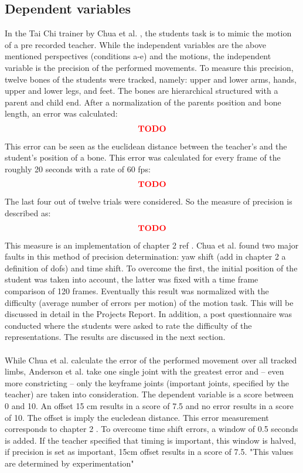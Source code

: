 \subsection{Dependent variables}
In the Tai Chi trainer by Chua et al. \cite{Chua}, the students task is to mimic the motion of a pre recorded teacher. While the independent variables are the above mentioned perspectives (conditions a-e) and the motions, the independent variable is the precision of the performed movements. To measure this precision, twelve bones of the students were tracked, namely: upper and lower arms, hands, upper and lower legs, and feet. The bones are hierarchical structured with a parent and child end. After a normalization of the parents position and bone length, an error was calculated:
\begin{equation}
	\textcolor{red}{\textbf{TODO}}
\end{equation}
This error can be seen as the euclidean distance between the teacher's and the student's position of a bone. This error was calculated for every frame of the roughly 20 seconds with a rate of 60 fps:
\begin{equation}
	\textcolor{red}{\textbf{TODO}}
\end{equation}
The last four out of twelve trials were considered. So the measure of precision is described as:
\begin{equation}
	\textcolor{red}{\textbf{TODO}}
\end{equation}
This measure is an implementation of chapter 2 ref \todo.
Chua et al. found two major faults in this method of precision determination: yaw shift (\todo add in chapter 2 a definition of dofs) and time shift. To overcome the first, the initial position of the student was taken into account, the latter was fixed with a time frame comparison of 120 frames. Eventually this result was normalized with the difficulty (average number of errors per motion) of the motion task. This will be discussed in detail in the Projects Report. In addition, a post questionnaire was conducted where the students were asked to rate the difficulty of the representations. The results are discussed in the next section.\\ \\
While Chua et al. calculate the error of the performed movement over all tracked limbs, Anderson et al. take one single joint with the greatest error and \--- even more constricting \--- only the keyframe joints (important joints, specified by the teacher) are taken into consideration. The dependent variable is a score between 0 and 10. An offset 15 cm results in a score of 7.5 and no error results in a score of 10. The offset is imply the eucledean distance. This error measurement corresponds to chapter 2 \todo. To overcome time shift errors, a window of 0.5 seconds is added. If the teacher specified that timing is important, this window is halved, if precision is set as important, 15cm offset results in a score of 7.5. "This values are determined by experimentation"
